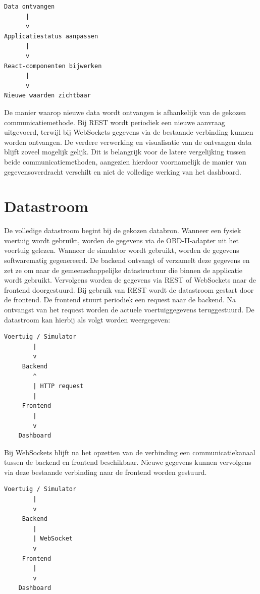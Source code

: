 \begin{verbatim}
Data ontvangen
      |
      v
Applicatiestatus aanpassen
      |
      v
React-componenten bijwerken
      |
      v
Nieuwe waarden zichtbaar
\end{verbatim}

De manier waarop nieuwe data wordt ontvangen is afhankelijk van de gekozen communicatiemethode. Bij REST wordt periodiek een nieuwe aanvraag uitgevoerd, terwijl bij WebSockets gegevens via de bestaande verbinding kunnen worden ontvangen.
De verdere verwerking en visualisatie van de ontvangen data blijft zoveel mogelijk gelijk. Dit is belangrijk voor de latere vergelijking tussen beide communicatiemethoden, aangezien hierdoor voornamelijk de manier van gegevensoverdracht verschilt en niet de volledige werking van het dashboard.

\section{Datastroom}
De volledige datastroom begint bij de gekozen databron. Wanneer een fysiek voertuig wordt gebruikt, worden de gegevens via de OBD-II-adapter uit het voertuig gelezen. Wanneer de simulator wordt gebruikt, worden de gegevens softwarematig gegenereerd.
De backend ontvangt of verzamelt deze gegevens en zet ze om naar de gemeenschappelijke datastructuur die binnen de applicatie wordt gebruikt. Vervolgens worden de gegevens via REST of WebSockets naar de frontend doorgestuurd.
Bij gebruik van REST wordt de datastroom gestart door de frontend. De frontend stuurt periodiek een request naar de backend. Na ontvangst van het request worden de actuele voertuiggegevens teruggestuurd.
De datastroom kan hierbij als volgt worden weergegeven:

\begin{verbatim}
Voertuig / Simulator
        |
        v
     Backend
        ^
        | HTTP request
        |
     Frontend
        |
        v
    Dashboard
\end{verbatim}

Bij WebSockets blijft na het opzetten van de verbinding een communicatiekanaal tussen de backend en frontend beschikbaar. Nieuwe gegevens kunnen vervolgens via deze bestaande verbinding naar de frontend worden gestuurd.

\begin{verbatim}
Voertuig / Simulator
        |
        v
     Backend
        |
        | WebSocket
        v
     Frontend
        |
        v
    Dashboard
\end{verbatim}

